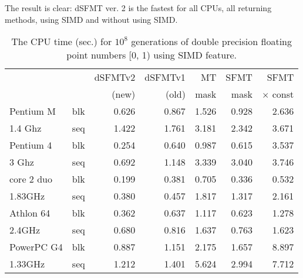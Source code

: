 \documentclass{svmult}
\begin{document}
The result is clear: dSFMT ver. 2 is the fastest for all CPUs, all
returning methods, using SIMD and without using SIMD.

\begin{table}
  \begin{center}
    \begin{tabular}{|ll|r|r|r|r|r|} \hline
      && dSFMTv2 & dSFMTv1 & MT & SFMT & SFMT \\
      && (new) & (old) & mask & mask & $\times$ const \\ \hline \hline
      Pentium M & blk & 0.626 & 0.867 & 1.526 & 0.928 & 2.636 \\
      1.4 Ghz & seq & 1.422 & 1.761 & 3.181 & 2.342 & 3.671 \\ \hline
      Pentium 4 & blk & 0.254 & 0.640 & 0.987 & 0.615 & 3.537 \\
      3 Ghz & seq & 0.692 & 1.148 & 3.339 & 3.040 & 3.746 \\ \hline
      core 2 duo & blk & 0.199 & 0.381 & 0.705 & 0.336 & 0.532 \\
      1.83GHz & seq & 0.380 & 0.457 & 1.817 & 1.317 & 2.161 \\\hline
      Athlon 64 & blk & 0.362 & 0.637 & 1.117 & 0.623 & 1.278 \\
      2.4GHz & seq & 0.680 & 0.816 & 1.637 & 0.763 & 1.623 \\ \hline
      PowerPC G4& blk & 0.887 & 1.151 & 2.175 & 1.657 & 8.897 \\
      1.33GHz & seq & 1.212 & 1.401 & 5.624 & 2.994 & 7.712 \\ \hline
    \end{tabular}
    \caption{The CPU time (sec.) for $10^8$ generations of double precision
      floating point numbers [0, 1) using SIMD feature.}
    \label{tab:speed-simd}
  \end{center}
\end{table}
\end{document}
